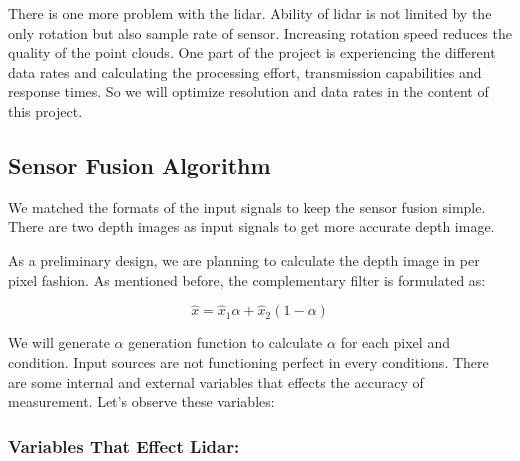 \documentclass[12pt]{article}
\begin{document}
There is one more problem with the lidar. Ability of lidar is not limited by the only rotation but also sample rate of sensor. Increasing rotation speed reduces the quality of the point clouds. One part of the project is experiencing the different data rates and calculating the processing effort, transmission capabilities and response times. So we will optimize resolution and data rates in the content of this project.

\subsection*{Sensor Fusion Algorithm}

We matched the formats of the input signals to keep the sensor fusion simple. There are two depth images as input signals to get more accurate depth image.

As a preliminary design, we are planning to calculate the depth image in per pixel fashion. As mentioned before, the complementary filter is formulated as:

\begin{equation}
    \hat{x} = \hat{x}_1 \alpha + \hat{x}_2 (1 - \alpha)
\end{equation}

We will generate $\alpha$ generation function to calculate $\alpha$ for each pixel and condition. Input sources are not functioning perfect in every conditions. There are some internal and external variables that effects the accuracy of measurement. Let’s observe these variables:


\subsubsection*{Variables That Effect Lidar:}
\end{document}
